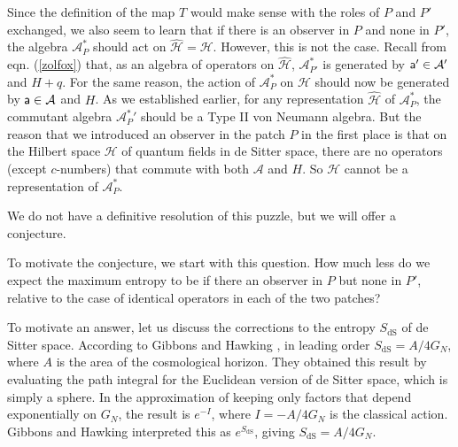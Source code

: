 \documentclass[11pt,a4paper]{article}
\def\a{{\sf a}}
\def\h{\widehat}
\def\A{{\mathcal A}}
\def\h{\widehat}
\def\H{{\mathcal H}}
\def\dS{{\mathrm{dS}}}
\begin{document}
   Since the definition of the map $T$ would make sense with the roles of $P$ and $P'$ exchanged, we also seem to learn that if there is an observer in $P$ and
   none in $P'$,  the algebra $\A_P^*$ should act on $\h\H=\H$. 
However, this is not the case. Recall from eqn. (\ref{zolfox}) that, as an algebra of operators on $\h\H$, $\A^*_{P'}$ is generated by $\a' \in \A'$ and $H+q$. For the same reason, the action of $\A^*_P$ on $\H$ should now be generated by $\a \in \A$ and $H$. As we established earlier, for any representation $\h\H$ of $\A^*_P$, the commutant algebra ${\A^*_P}'$ should be a Type II von Neumann algebra. But the reason that we introduced an observer in the patch $P$ in 
the first place is that on the Hilbert space $\H$ of quantum fields in de Sitter space, there are no operators (except $c$-numbers) that commute with both $\A$ and $H$. So $\H$ cannot be a representation of $\A^*_P$.



We do not have a definitive resolution of this puzzle, but we will offer
a conjecture.

To motivate the conjecture, we start with this question.    How much less do we expect the maximum entropy to be if there an observer in $P$ but none in $P'$,
relative to the case of identical operators in each of the two patches?

To motivate an answer, let us discuss the corrections to the entropy $S_\dS$ of de Sitter space.  According to Gibbons and Hawking \cite{GH}, in leading order  $S_\dS=A/4G_N$, where $A$ is the area of the cosmological horizon.   They obtained this result by evaluating the path integral for the Euclidean version of
de Sitter space, which is simply a sphere.   In the approximation of keeping only factors that depend exponentially on $G_N$, the result is $e^{-I}$,
where $I=-A/4G_N$ is the classical action.   Gibbons and Hawking interpreted this as $e^{S_\dS}$, giving $S_\dS=A/4G_N$.
\end{document}
